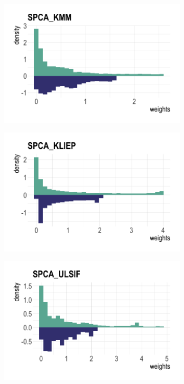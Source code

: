 \documentclass[a4paper,12pt]{article}
\begin{document}
\begin{figure}[H]
\begin{subfigure}{.32\textwidth}
  \centering
  \includegraphics[width=\linewidth]{toy1.png}
  \label{fig:sfig1}
\end{subfigure}
\begin{subfigure}{.32\textwidth}
  \centering
  \includegraphics[width=\linewidth]{toy2.png}
  \label{fig:sfig2}
\end{subfigure} 
\begin{subfigure}{.32\textwidth}
  \centering
  \includegraphics[width=\linewidth]{toy3.png}

\end{subfigure}
\end{figure}
\end{document}
